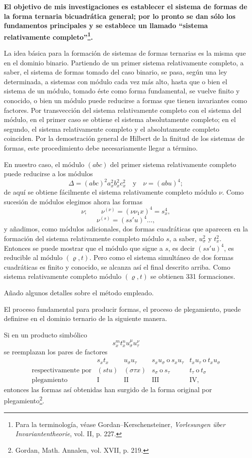 \documentclass[11pt]{article}
\begin{document}
\textbf{El objetivo de mis investigaciones es establecer el sistema de formas de la forma ternaria bicuadrática general; por lo pronto se dan sólo los fundamentos principales y se establece un llamado ``sistema relativamente completo''\footnote{Para la terminología, véase Gordan--Kerschensteiner, \emph{Vorlesungen über Invariantentheorie}, vol. II, p. 227.}.}

La idea básica para la formación de sistemas de formas ternarias es la misma que en el dominio binario. Partiendo de un primer sistema relativamente completo, a saber, el sistema de formas tomado del caso binario, se pasa, según una ley determinada, a sistemas con módulo cada vez más alto, hasta que o bien el sistema de un módulo, tomado éste como forma fundamental, se vuelve finito y conocido, o bien un módulo puede reducirse a formas que tienen invariantes como factores. Por transvección del sistema relativamente completo con el sistema del módulo, en el primer caso se obtiene el sistema absolutamente completo; en el segundo, el sistema relativamente completo y el absolutamente completo coinciden. Por la demostración general de Hilbert de la finitud de los sistemas de formas, este procedimiento debe necesariamente llegar a término.

En nuestro caso, el módulo \((abc)\) del primer sistema relativamente completo puede reducirse a los módulos
\[
\Delta=(abc)^2a_x^2b_x^2c_x^2\quad\text{y}\quad \nu=(abu)^4;
\]
de aquí se obtiene fácilmente el sistema relativamente completo módulo \(\nu\). Como sucesión de módulos elegimos ahora las formas
\[
\nu;\qquad \nu^{(\nu)}=(\nu\nu_1x)^4=s_x^4,
\]
\[
\nu^{(s)}=(ss'u)^4\ldots,
\]
y añadimos, como módulos adicionales, dos formas cuadráticas que aparecen en la formación del sistema relativamente completo módulo \(s\), a saber, \(u_\sigma^2\) y \(t_x^2\). Entonces se puede mostrar que el módulo que sigue a \(s\), es decir \((ss'u)^4\), es reducible al módulo \((\varrho,t)\). Pero como el sistema simultáneo de dos formas cuadráticas es finito y conocido, se alcanza así el final descrito arriba. Como sistema relativamente completo módulo \((\varrho,t)\) se obtienen 331 formaciones.

Añado algunos detalles sobre el método empleado.

El proceso fundamental para producir formas, el proceso de plegamiento, puede definirse en el dominio ternario de la siguiente manera.

Si en un producto simbólico
\[
s_x^m t_x^n u_\sigma^\mu u_\tau^\nu
\]
se reemplazan los pares de factores
\[
\begin{array}{c|c|c|c|c}
 & s_xt_x & u_\sigma u_\tau & s_xu_\sigma\ \text{o}\ s_xu_\tau & t_xu_\tau\ \text{o}\ t_xu_\sigma\\
\text{respectivamente por} & (stu) & (\sigma\tau x) & s_\sigma\ \text{o}\ s_\tau & t_\tau\ \text{o}\ t_\sigma\\
\text{plegamiento} & \mathrm{I} & \mathrm{II} & \mathrm{III} & \mathrm{IV},
\end{array}
\]
entonces las formas así obtenidas han surgido de la forma original por plegamiento\footnote{Gordan, Math. Annalen, vol. XVII, p. 219.}.
\end{document}
